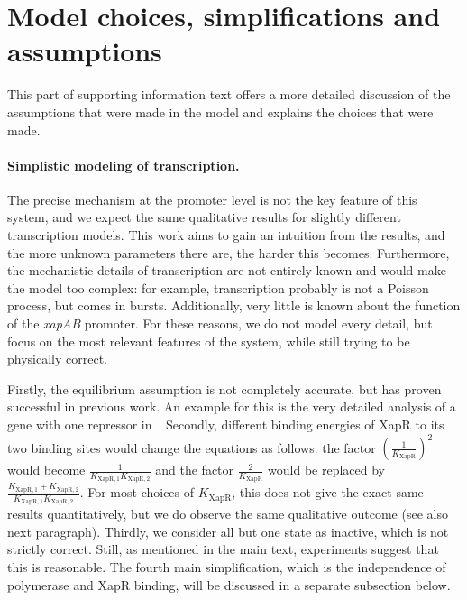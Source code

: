 \documentclass[10pt,letterpaper]{article}
\newcommand{\n}[1]{\mathrm{#1}}
\begin{document}
\newpage

\section{Model choices, simplifications and assumptions}
This part of supporting information text offers a more detailed discussion of the assumptions that were made in the model and explains the choices that were made.

\paragraph*{Simplistic modeling of transcription.} The precise mechanism at the promoter level is not the key feature of this system, and we expect the same qualitative results for slightly different transcription models. This work aims to gain an intuition from the results, and the more unknown parameters there are, the harder this becomes. Furthermore, the mechanistic details of transcription are not entirely known and would make the model too complex: for example, transcription probably is not a Poisson process, but comes in bursts. Additionally, very little is known about the function of the \emph{xapAB} promoter. For these reasons, we do not model every detail, but focus on the most relevant features of the system, while still trying to be physically correct.

Firstly, the equilibrium assumption is not completely accurate, but has proven successful in previous work. An example for this is the very detailed analysis of a gene with one repressor in~\cite{Phillips2018}. Secondly, different binding energies of XapR to its two binding sites would change the equations as follows: the factor $\left(\frac{1}{K_{\n{XapR}}}\right)^2$ would become $\frac{1}{K_{\n{XapR,1}} K_{\n{XapR,2}}}$ and the factor $\frac{2}{K_{\n{XapR}}}$ would be replaced by $\frac{K_{\n{XapR,1}} + K_{\n{XapR,2}}}{K_{\n{XapR,1}} K_{\n{XapR,2}}}$. For most choices of $K_{\n{XapR}}$, this does not give the exact same results quantitatively, but we do observe the same qualitative outcome (see also next paragraph). Thirdly, we consider all but one state as inactive, which is not strictly correct. Still, as mentioned in the main text, experiments suggest that this is reasonable. The fourth main simplification, which is the independence of polymerase and XapR binding, will be discussed in a separate subsection below.
\end{document}
